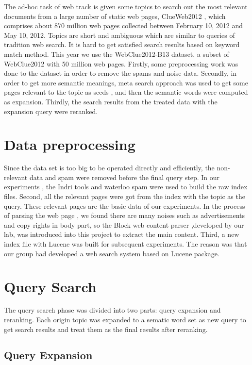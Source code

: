 \documentclass[runningheads,a4paper]{llncs}
\begin{document}
The ad-hoc task of web track is given some topics to search out the most relevant documents from a large number of static web pages, ClueWeb2012 \cite{clueweb2012}, which comprises about 870 million web pages collected between February 10, 2012 and May 10, 2012. Topics are short and ambiguous which are similar to queries of tradition web search. It is hard to get satisfied search results based on keyword match method. This year we use the WebClue2012-B13 dataset, a subset of WebClue2012 with 50 million web pages. Firstly, some preprocessing work was done to the dataset in order to remove the spams and noise data. Secondly, in order to get more semantic meanings, meta search approach was used to get some pages relevant to the topic as seeds , and then the semantic words were computed as expansion. Thirdly, the search results from the treated data with the expansion query were reranked. 

\section{Data preprocessing}

Since the data set is too big to be operated directly and efficiently, the non-relevant  data and spam were removed before the final query step. In our experiments , the Indri \cite{indri} tools and waterloo spam \cite{2011-Cormack-p441-465} were used to build the raw index files. Second, all the relevant pages were got from the index with the topic as the query. These relevant pages are the basic data of our experiments. In the process of parsing the web page , we found there are many noises such as advertisements and copy rights in body part, so the Block web content parser \cite{2012-Lin-p256-264} ,developed by our lab, was introduced into this project to extract the main content. Third, a new index file with Lucene \cite{lucene} was built for subsequent experiments.  The reason was that our group had developed a web search system based on Lucene package.

\section{Query Search}

The query search phase was divided into two parts: query expansion and reranking. Each origin topic was expanded to a sematic word set as new query to get search results and treat them as the final results after reranking. 

\subsection{Query Expansion }
\end{document}
